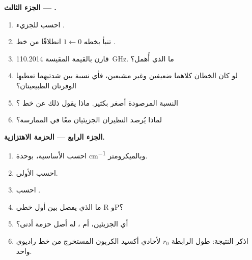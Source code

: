 \begin{problem}
\medskip\noindent\textbf{الجزء الثالث --- .}
\begin{enumerate}[resume]
  \item احسب  للجزيء .
  \item تنبأ بخطه $1 \leftarrow 0$ انطلاقًا من خط .
  \item قارن بالقيمة المقيسة \qty{110.2014}{GHz}. ما الذي أُهمل؟
  \item لو كان الخطان كلاهما ضعيفين وغير مشبعين، فأي نسبة بين
        شدتيهما تعطيها الوفرتان الطبيعيتان؟
  \item النسبة المرصودة أصغر بكثير. ماذا يقول ذلك عن
        خط ؟
  \item لماذا يُرصد النظيران الجزيئيان معًا في الممارسة؟
\end{enumerate}

\medskip\noindent\textbf{الجزء الرابع --- الحزمة الاهتزازية.}
\begin{enumerate}[resume]
  \item احسب  الأساسية، بوحدة \unit{cm^{-1}} 
        وبالميكرومتر.
  \item احسب  الأولى.
  \item احسب .
  \item ما الذي يفصل بين أول خطي R وP؟
  \item أي الجزيئين،  أم ، له أصل حزمة أدنى؟
  \item اذكر النتيجة: طول الرابطة $r_0$ لأحادي أكسيد الكربون المستخرج
        من خط راديوي واحد.
\end{enumerate}
\end{problem}
